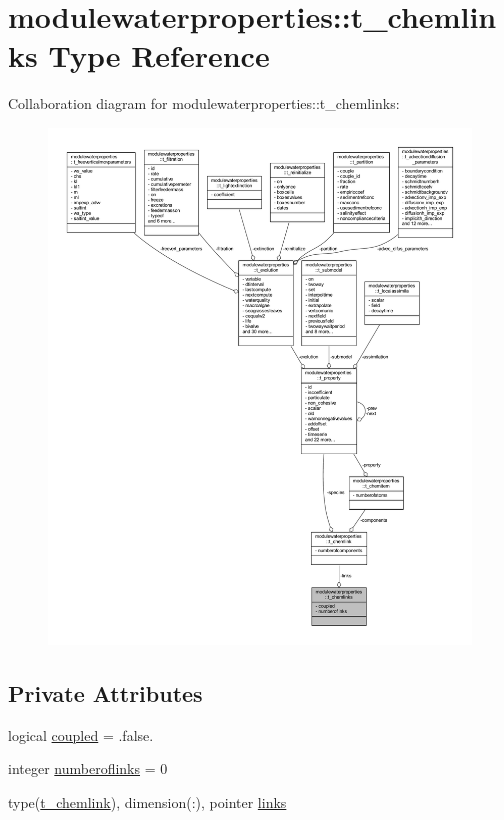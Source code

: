 \hypertarget{structmodulewaterproperties_1_1t__chemlinks}{}\section{modulewaterproperties\+:\+:t\+\_\+chemlinks Type Reference}
\label{structmodulewaterproperties_1_1t__chemlinks}


Collaboration diagram for modulewaterproperties\+:\+:t\+\_\+chemlinks\+:\nopagebreak
\begin{figure}[H]
\begin{center}
\leavevmode
\includegraphics[width=350pt]{structmodulewaterproperties_1_1t__chemlinks__coll__graph}
\end{center}
\end{figure}
\subsection*{Private Attributes}
\begin{DoxyCompactItemize}
\item 
logical \mbox{\hyperlink{structmodulewaterproperties_1_1t__chemlinks_a7eabdba130ca0f866f09f7453c3c6785}{coupled}} = .false.
\item 
integer \mbox{\hyperlink{structmodulewaterproperties_1_1t__chemlinks_a6eb7cea0386b4cc4272d37441e838039}{numberoflinks}} = 0
\item 
type(\mbox{\hyperlink{structmodulewaterproperties_1_1t__chemlink}{t\+\_\+chemlink}}), dimension(\+:), pointer \mbox{\hyperlink{structmodulewaterproperties_1_1t__chemlinks_aad6d8aa29d9f54b6f414418a1915d06d}{links}}
\end{DoxyCompactItemize}



